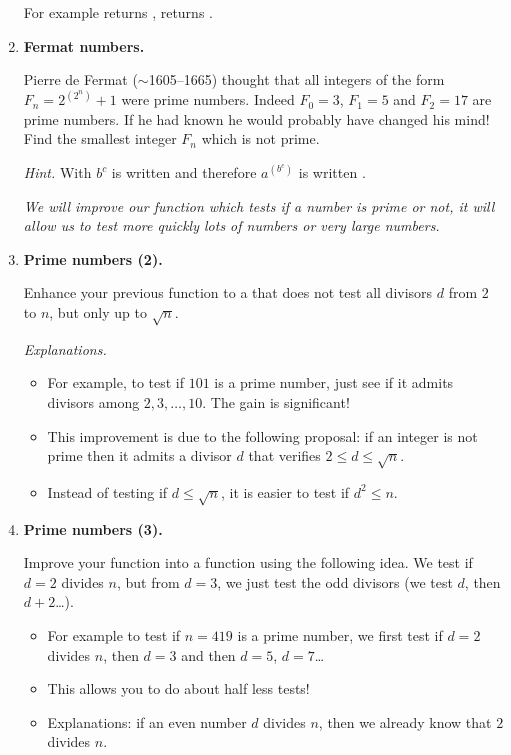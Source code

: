 \documentclass[11pt,class=report,crop=false]{standalone}
\begin{document}
\begin{activite}
\begin{enumerate}
  For example  returns ,  returns .
  
  \item \textbf{Fermat numbers.}
  
  Pierre de Fermat ($\sim$1605--1665) thought that all integers of the form $F_n = 2^{(2^n)}+1$ were prime numbers. Indeed $F_0=3$, $F_1=5$ and $F_2=17$
  are prime numbers. If he had known \Python{} he would probably have changed his mind! Find the smallest integer $F_n$ which is not prime.
  
  \emph{Hint.} With \Python{} $b^c$ is written  and therefore
  $a^{(b^c)}$ is written .
  
  \bigskip
  
  \emph{We will improve our function which tests if a number is prime or not, it will allow us to test more quickly lots of numbers or very large numbers.}  
  
  \item \textbf{Prime numbers (2).}
  
   Enhance your previous function to a  that does not test all divisors $d$ from $2$ to $n$, but only up to $\sqrt{n}$.
   
  \emph{Explanations.}
  \begin{itemize}
    \item For example, to test if $101$ is a prime number, just see if it admits divisors among $2,3,\ldots,10$. The gain is significant!
    
    \item This improvement is due to the following proposal: if an integer is not prime then it admits a divisor $d$ that verifies $2 \le d \le \sqrt{n}$.
    
    \item Instead of testing if $d \le \sqrt{n}$, it is easier to test if $d^2 \le n$.
   \end{itemize} 
  
  
  \item \textbf{Prime numbers (3).}  
  
  Improve your function into a function  using the following idea.  We test if $d=2$ divides $n$, but from $d=3$, we just test the odd divisors (we test $d$, then $d+2$\ldots).
 
 \begin{itemize}
   \item For example to test if $n = 419$ is a prime number, we first test if $d=2$ divides $n$, then $d=3$ and then $d=5$, $d=7$\ldots 
   \item This allows you to do about half less tests!
   \item Explanations: if an even number $d$ divides $n$, then we already know that $2$ divides $n$.   
   \end{itemize}
  

\end{enumerate}
\end{activite}
\end{document}
